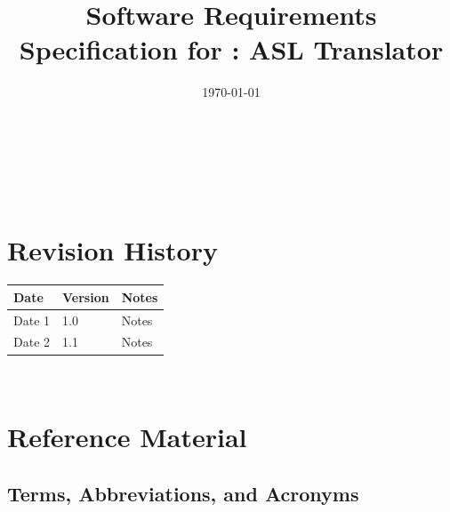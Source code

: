 \documentclass[12pt]{article}
\begin{document}
\title{Software Requirements Specification for \progname: ASL Translator} 
\author{\authname}
\date{\today}

\maketitle

~\newpage


\tableofcontents

~\newpage

\section*{Revision History}

\begin{tabularx}{\textwidth}{p{3cm}p{2cm}X}
\toprule {\bf Date} & {\bf Version} & {\bf Notes}\\
\midrule
Date 1 & 1.0 & Notes\\
Date 2 & 1.1 & Notes\\
\bottomrule
\end{tabularx}

~\newpage

\section{Reference Material}

\subsection{Terms, Abbreviations, and Acronyms}
\end{document}
